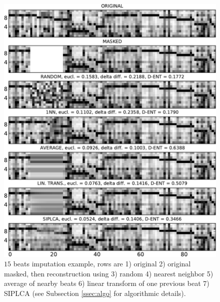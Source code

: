 \documentclass{article}
\begin{document}

\begin{figure}[t]
\begin{center}
\includegraphics[width=.99\columnwidth]{basic2}
\end{center}
\caption{$15$ beats imputation example, rows are 1) original 2) original masked,
then reconstruction using 3) random 4) nearest neighbor 5) average of nearby beats
6) linear transform of one previous beat 7) SIPLCA (see Subsection \ref{ssec:algo}
for algorithmic details).
\label{fig:basic}}
\end{figure}

\end{document}
